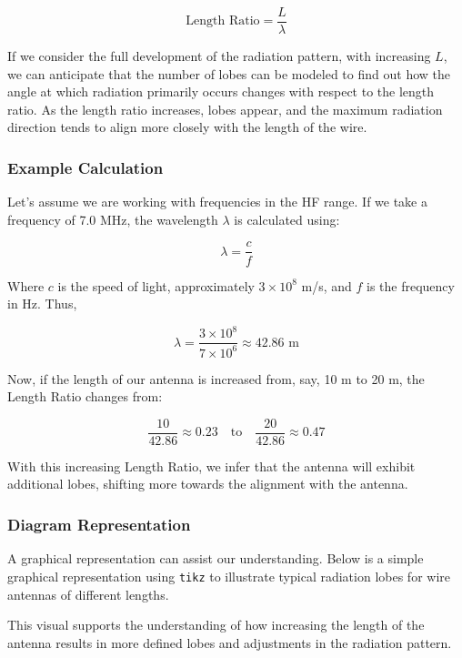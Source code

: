 \[
\text{Length Ratio} = \frac{L}{\lambda}
\]

If we consider the full development of the radiation pattern, with increasing $L$, we can anticipate that the number of lobes can be modeled to find out how the angle at which radiation primarily occurs changes with respect to the length ratio. As the length ratio increases, lobes appear, and the maximum radiation direction tends to align more closely with the length of the wire.

\subsubsection{Example Calculation}

Let’s assume we are working with frequencies in the HF range. If we take a frequency of 7.0 MHz, the wavelength $\lambda$ is calculated using:

\[
\lambda = \frac{c}{f}
\]

Where $c$ is the speed of light, approximately $3 \times 10^8$ m/s, and $f$ is the frequency in Hz. Thus,

\[
\lambda = \frac{3 \times 10^8}{7 \times 10^6} \approx 42.86 \text{ m}
\]

Now, if the length of our antenna is increased from, say, 10 m to 20 m, the Length Ratio changes from:

\[
\frac{10}{42.86} \approx 0.23 \quad \text{to} \quad \frac{20}{42.86} \approx 0.47
\]

With this increasing Length Ratio, we infer that the antenna will exhibit additional lobes, shifting more towards the alignment with the antenna.

\subsubsection{Diagram Representation}

A graphical representation can assist our understanding. Below is a simple graphical representation using \texttt{tikz} to illustrate typical radiation lobes for wire antennas of different lengths.


This visual supports the understanding of how increasing the length of the antenna results in more defined lobes and adjustments in the radiation pattern.
